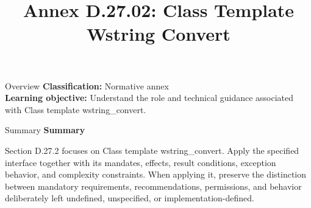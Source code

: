 \documentclass[10pt,letterpaper]{article}
\title{Annex D.27.02: Class Template Wstring Convert}
\author{}
\date{}
\begin{document}
\maketitle
\begin{CornellOverviewBox}{Overview}
\textbf{Classification:} Normative annex\\[2pt]
\textbf{Learning objective:} Understand the role and technical guidance associated with Class template wstring\_convert.
\end{CornellOverviewBox}\begin{CornellSummaryBox}{Summary}
{\sffamily\bfseries\color{Accent} Summary}\par\vspace{3pt}Section D.27.2 focuses on Class template wstring\_convert. Apply the specified interface together with its mandates, effects, result conditions, exception behavior, and complexity constraints. When applying it, preserve the distinction between mandatory requirements, recommendations, permissions, and behavior deliberately left undefined, unspecified, or implementation-defined.
\end{CornellSummaryBox}
\end{document}
